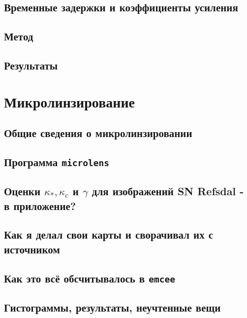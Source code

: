 \documentclass{mipt-thesis-ms}
\numberwithin{equation}{chapter}
\begin{document}
\section{Временные задержки и коэффициенты усиления}

\section{Метод}

\section{Результаты}


\chapter{Микролинзирование}

\section{Общие сведения о микролинзировании}

\section{Программа \texttt{microlens}}

\section{Оценки $\kappa_*, \kappa_c$ и $\gamma$ для изображений SN Refsdal - в приложение?}

\section{Как я делал свои карты и сворачивал их с источником}
\section{Как это всё обсчитывалось в \tt{emcee}}
\section{Гистограммы, результаты, неучтенные вещи}




%
%
%
\end{document}
